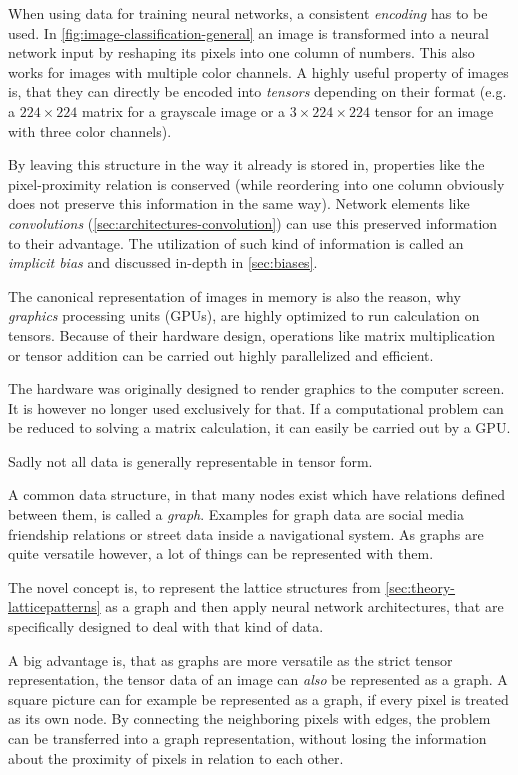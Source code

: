 When using data for training neural networks, a consistent \emph{encoding} has to be used.
In \autoref{fig:image-classification-general} an image is transformed into a neural network input by reshaping its pixels into one column of numbers. This also works for images with multiple color channels.
A highly useful property of images is, that they can directly be encoded into \emph{tensors} depending on their format (e.g. a $224\times224$ matrix for a grayscale image or a $3\times224\times224$ tensor for an image with three color channels).

By leaving this structure in the way it already is stored in, properties like the pixel-proximity relation is conserved (while reordering into one column obviously does not preserve this information in the same way).
Network elements like \emph{convolutions} (\autoref{sec:architectures-convolution}) can use this preserved information to their advantage. 
The utilization of such kind of information is called an \emph{implicit bias} and discussed in-depth in \autoref{sec:biases}.

The canonical representation of images in memory is also the reason, why \emph{graphics} processing units (GPUs), are highly optimized to run calculation on tensors.
Because of their hardware design, operations like matrix multiplication or tensor addition can be carried out highly parallelized and efficient.

The hardware was originally designed to render graphics to the computer screen. 
It is however no longer used exclusively for that.
If a computational problem can be reduced to solving a matrix calculation, it can easily be carried out by a GPU.

Sadly not all data is generally representable in tensor form. 

A common data structure, in that many nodes exist which have relations defined between them, is called a \emph{graph}.
Examples for graph data are social media friendship relations or street data inside a navigational system.
As graphs are quite versatile however, a lot of things can be represented with them.

The novel concept is, to represent the lattice structures from \autoref{sec:theory-latticepatterns} as a graph and then apply neural network architectures, that are specifically designed to deal with that kind of data.

A big advantage is, that as graphs are more versatile as the strict tensor representation, the tensor data of an image can \emph{also} be represented as a graph. 
A square picture can for example be represented as a graph, if every pixel is treated as its own node. 
By connecting the neighboring pixels with edges, the problem can be transferred into a graph representation, without losing the information about the proximity of pixels in relation to each other.

